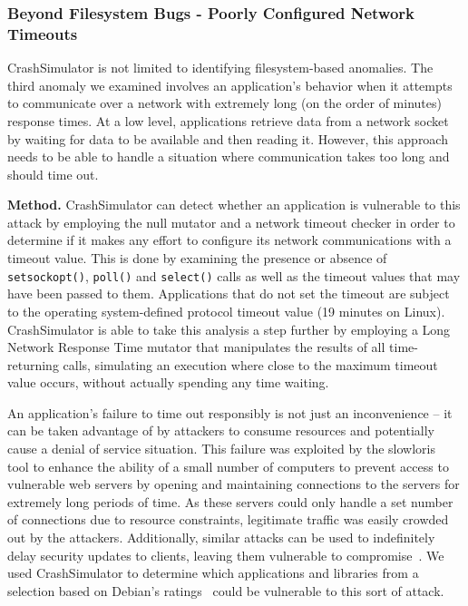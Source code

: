 \subsubsection{Beyond Filesystem Bugs - Poorly Configured Network Timeouts}
\label{sec-timeout-bugs}

CrashSimulator is not limited
to identifying filesystem-based anomalies.
The third anomaly we examined
involves an application's behavior
when it attempts to communicate
over a network with extremely long
(on the order of minutes) response times.
At a low level,
applications retrieve data from a network socket
by waiting for data to be available and then reading it.
However,
this approach needs to be able to handle
a situation where communication
takes too long and should time out.

{\bf Method.}
CrashSimulator can detect
whether an application is vulnerable to this attack
by employing the null mutator and a network timeout checker
in order to determine if it makes any effort
to configure its network communications with a timeout value.
This is done
by examining the presence or absence of {\tt setsockopt()}, {\tt poll()}
and {\tt select()} calls as well as the timeout values that may
have been passed to them. Applications that do not set the timeout are
subject to the operating system-defined protocol timeout value (19 minutes
on Linux).
CrashSimulator is able to take this analysis a step further by employing a
Long Network Response Time mutator
that manipulates
the results of all time-returning calls,
simulating an execution where close
to the maximum timeout value occurs,
without actually spending any time
waiting.

An application's failure
to time out responsibly
is not just an inconvenience --
it can be taken advantage of by attackers
to consume resources and potentially cause a denial of service situation.
This failure was exploited by the slowloris~\cite{Slowloris} tool
to enhance the ability
of a small number of computers to prevent access
to vulnerable web servers
by opening and maintaining connections to the servers
for extremely long periods of time.
As these servers could only handle a set number of connections
due to resource constraints,
legitimate traffic was easily crowded out by the attackers.
Additionally, similar attacks can be used to
indefinitely delay security updates to
clients, leaving them vulnerable to compromise~\cite{Cappos_TR_08}.
We used CrashSimulator to determine which applications and
libraries from a selection based on Debian's ratings~\cite{DebPopCon}
could be vulnerable to this sort of attack.

